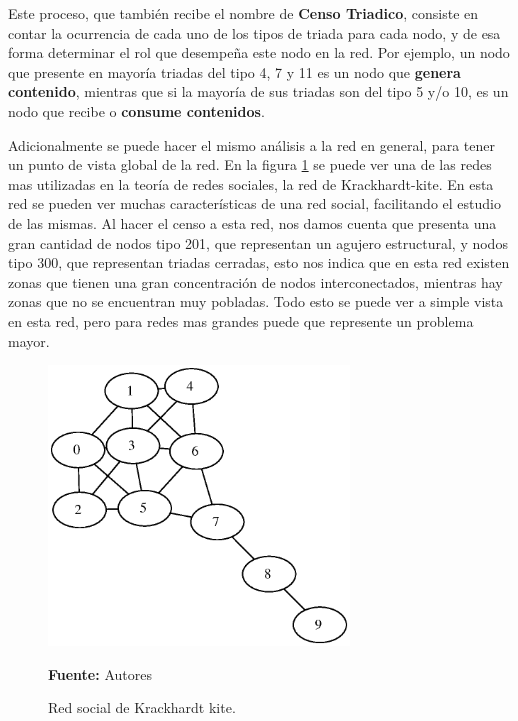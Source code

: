 Este proceso, que también recibe el nombre de \textbf{Censo Triadico}, consiste en contar la ocurrencia de cada uno de los tipos de triada para cada nodo, y de esa forma determinar el rol que desempeña este nodo en la red. Por ejemplo, un nodo que presente en mayoría triadas del tipo 4, 7 y 11 es un nodo que \textbf{genera contenido}, mientras que si la mayoría de sus triadas son del tipo 5 y/o 10, es un nodo que recibe o \textbf{consume contenidos}.

Adicionalmente se puede hacer el mismo análisis a la red en general, para tener un punto de vista global de la red. En la figura \ref{fig:red_krackhardt} se puede ver una de las redes mas utilizadas en la teoría de redes sociales, la red de Krackhardt-kite. En esta red se pueden ver muchas características de una red social, facilitando el estudio de las mismas. Al hacer el censo a esta red, nos damos cuenta que presenta una gran cantidad de nodos tipo 201, que representan un agujero estructural, y nodos tipo 300, que representan triadas cerradas, esto nos indica que en esta red existen zonas que tienen una gran concentración de nodos interconectados, mientras hay zonas que no se encuentran muy pobladas. Todo esto se puede ver a simple vista en esta red, pero para redes mas grandes puede que represente un problema mayor.

\begin{figure}[!htb]
  \begin{center}
    \includegraphics[width=8cm]{./imagenes/red_krackhardt_kite.eps}
    \caption{Red social de Krackhardt kite.}
    \label{fig:red_krackhardt}
    \textbf{Fuente:}  Autores
  \end{center}
\end{figure}
